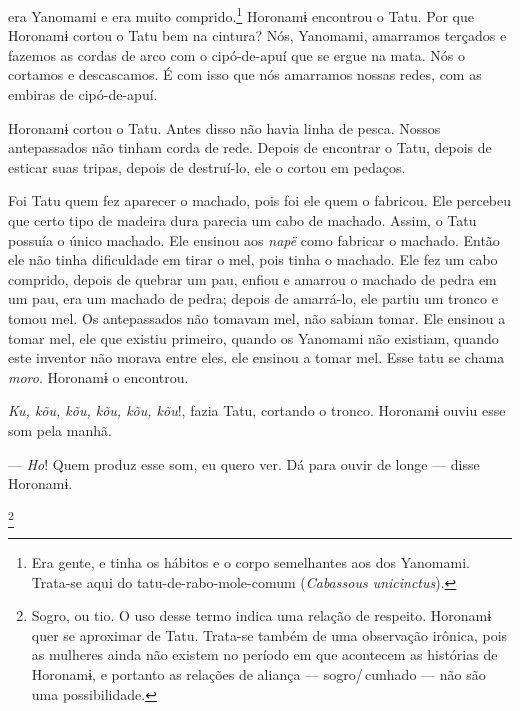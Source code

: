  era Yanomami e era muito comprido.\footnote{Era gente, e tinha os hábitos e o corpo semelhantes aos dos Yanomami. Trata-se aqui do tatu-de-rabo-mole-comum (\textit{Cabassous unicinctus}).}  Horonamɨ encontrou o Tatu. Por que Horonamɨ cortou o Tatu bem na cintura? Nós, Yanomami, amarramos terçados e fazemos as cordas de arco com o cipó-de-apuí que se ergue na
mata. Nós o cortamos e descascamos. É com isso que nós amarramos nossas
redes, com as embiras de cipó-de-apuí. 

Horonamɨ cortou o Tatu. Antes disso não havia linha de pesca. Nossos
antepassados não tinham corda de rede. Depois de encontrar o Tatu,
depois de esticar suas tripas, depois de destruí-lo, ele o cortou em
pedaços. 

Foi Tatu quem fez aparecer o machado, pois foi ele quem o fabricou. Ele
percebeu que certo tipo de madeira dura parecia um cabo de machado.
Assim, o Tatu possuía o único machado. Ele ensinou aos \textit{napë} como
fabricar o machado. Então ele não tinha dificuldade em tirar o mel, pois
tinha o machado. Ele fez um cabo comprido, depois de quebrar um pau,
enfiou e amarrou o machado de pedra em um pau, era um machado de pedra;
depois de amarrá-lo, ele partiu um tronco e tomou mel. Os antepassados
não tomavam mel, não sabiam tomar. Ele ensinou a tomar mel, ele que
existiu primeiro, quando os Yanomami não existiam, quando este inventor
não morava entre eles, ele ensinou a tomar mel. Esse tatu se
chama \textit{moro}. Horonamɨ o encontrou. 

\textit{Ku, kõu, kõu, kõu, kõu, kõu}!, fazia Tatu, cortando o tronco.
Horonamɨ ouviu esse som pela manhã. 

--- \textit{Ho}! Quem produz esse som, eu quero ver. Dá para ouvir de longe --- disse
Horonamɨ. 

\footnote{Sogro, ou tio. O uso desse termo indica uma relação de respeito. Horonamɨ quer se aproximar de Tatu. Trata-se também de uma observação irônica, pois as mulheres ainda não existem no período em que acontecem as histórias de Horonamɨ, e portanto as relações de aliança --- sogro/\,cunhado --- não são uma possibilidade.}

